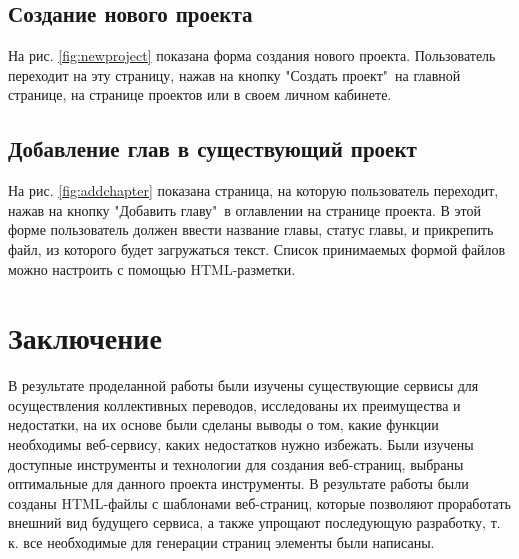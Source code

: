 \documentclass[a4paper,12pt]{article}
\begin{document}
\subsection{Создание нового проекта}
На рис. \ref{fig:newproject} показана форма создания нового проекта. Пользователь переходит на эту страницу, нажав на кнопку "Создать проект"\ на главной странице, на странице проектов или в своем личном кабинете.


\subsection{Добавление глав в существующий проект}
На рис. \ref{fig:addchapter} показана страница, на которую пользователь переходит, нажав на кнопку "Добавить главу"\ в оглавлении на странице проекта. В этой форме пользователь должен ввести название главы, статус главы, и прикрепить файл, из которого будет загружаться текст. Список принимаемых формой файлов можно настроить с помощью HTML-разметки.






\newpage
\section*{Заключение}
В результате проделанной работы были изучены существующие сервисы для осуществления коллективных переводов, исследованы их преимущества и недостатки, на их основе были сделаны выводы о том, какие функции необходимы веб-сервису, каких недостатков нужно избежать. Были изучены доступные инструменты и технологии для создания веб-страниц, выбраны оптимальные для данного проекта инструменты. В результате работы были созданы HTML-файлы с шаблонами веб-страниц, которые позволяют проработать внешний вид будущего сервиса, а также упрощают последующую разработку, т. к. все необходимые для генерации страниц элементы были написаны.\\





\newpage
{}


\end{document}
